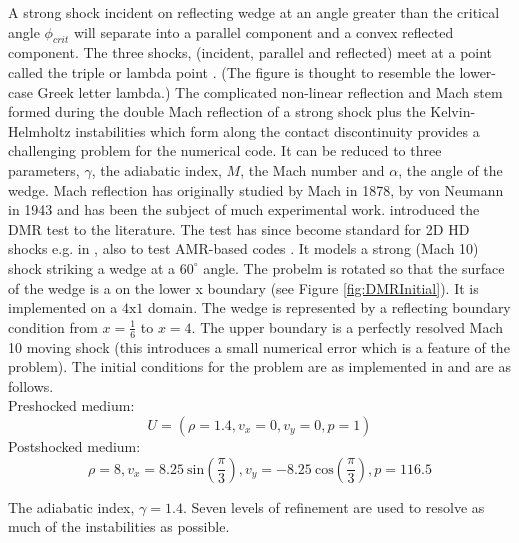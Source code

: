 A strong shock incident on reflecting wedge at an angle greater than the critical angle $\phi_{crit}$ will separate into a parallel component and a convex reflected component. 
The three shocks, (incident, parallel and reflected) meet at a point called the triple or lambda point \citep{1959flme.book.....L}. (The figure is thought to resemble the lower-case Greek letter lambda.)
The complicated non-linear reflection and Mach stem formed during the double Mach reflection of a strong shock plus the Kelvin-Helmholtz instabilities which form along the contact discontinuity provides a challenging problem for the numerical code.
It can be reduced to three parameters, $\gamma$, the adiabatic index, $M$, the Mach number and $\alpha$, the angle of the wedge.
Mach reflection has originally studied by Mach in 1878, by von Neumann in 1943 and has been the subject of much experimental work.
\citet{1984jcp_woodward_colella} introduced the DMR test to the literature.
The test has since become standard for 2D HD shocks e.g. in \citet{Toth96:_compar,1992ApJS...80..753S}, also to test AMR-based codes \citep{1989JCoPh..82...64B}.
It models a strong (Mach 10) shock striking a wedge at a $60^{\circ}$ angle. 
The probelm is rotated so that the surface of the wedge is a on the lower x boundary (see Figure \ref{fig:DMRInitial}).
It is implemented on a $4\mathrm{x}1$ domain. 
The wedge is represented by a reflecting boundary condition from $x=\frac{1}{6}$ to $x=4$. The upper boundary is a perfectly resolved Mach 10 moving shock (this introduces a small numerical error which is a feature of the problem).
The initial conditions for the problem are as implemented in 
\citet{Toth96:_compar,1984jcp_woodward_colella} and are as follows.
\\Preshocked medium:
\begin{equation}
U = \left( 
\rho = 1.4,
v_x =0,
v_y = 0,
p = 1
\right)
\end{equation}
Postshocked medium:
\begin{equation}
\rho = 8,
v_x = 8.25~\mathrm{sin}\left(\frac{\pi}{3}\right),
v_y = -8.25~\mathrm{cos}\left(\frac{\pi}{3}\right),
p = 116.5
\end{equation}

The adiabatic index, $\gamma = 1.4$.
Seven levels of refinement are used to resolve as much of the instabilities as possible.

